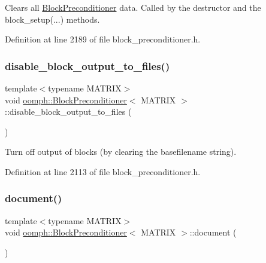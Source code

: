 Clears all \hyperlink{classoomph_1_1BlockPreconditioner}{Block\+Preconditioner} data. Called by the destructor and the block\+\_\+setup(...) methods. 



Definition at line 2189 of file block\+\_\+preconditioner.\+h.

\mbox{\label{classoomph_1_1BlockPreconditioner_a45b37f1934144d882831bf354f35d035}} 
\subsubsection{\texorpdfstring{disable\+\_\+block\+\_\+output\+\_\+to\+\_\+files()}{disable\_block\_output\_to\_files()}}
{\footnotesize\ttfamily template$<$typename M\+A\+T\+R\+IX$>$ \\
void \hyperlink{classoomph_1_1BlockPreconditioner}{oomph\+::\+Block\+Preconditioner}$<$ M\+A\+T\+R\+IX $>$\+::disable\+\_\+block\+\_\+output\+\_\+to\+\_\+files (\begin{DoxyParamCaption}{ }\end{DoxyParamCaption})\hspace{0.3cm}{\ttfamily [inline]}}



Turn off output of blocks (by clearing the basefilename string). 



Definition at line 2113 of file block\+\_\+preconditioner.\+h.

\mbox{\label{classoomph_1_1BlockPreconditioner_a289db176ccafcc3719367fa98340f94d}} 
\subsubsection{\texorpdfstring{document()}{document()}}
{\footnotesize\ttfamily template$<$typename M\+A\+T\+R\+IX$>$ \\
void \hyperlink{classoomph_1_1BlockPreconditioner}{oomph\+::\+Block\+Preconditioner}$<$ M\+A\+T\+R\+IX $>$\+::document (\begin{DoxyParamCaption}{ }\end{DoxyParamCaption})\hspace{0.3cm}{\ttfamily [inline]}}



